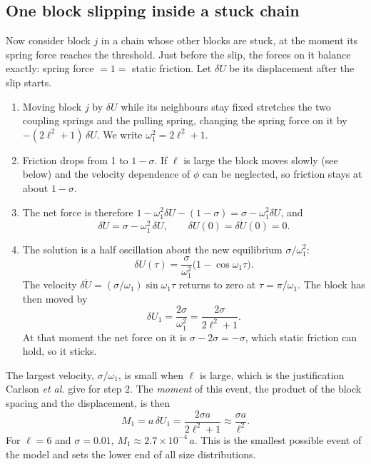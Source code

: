 \subsection{One block slipping inside a stuck chain}
\label{sec:one-block-event}

Now consider block $j$ in a chain whose other blocks are stuck, at the moment its spring force reaches the threshold.
Just before the slip, the forces on it balance exactly: spring force $= 1 =$ static friction. Let $\delta U$ be its
displacement after the slip starts.
\begin{enumerate}
  \item Moving block $j$ by $\delta U$ while its neighbours stay fixed stretches the two coupling springs and the pulling
    spring, changing the spring force on it by $-(2\ell^2+1)\,\delta U$. We write $\omega_1^2 = 2\ell^2+1$.
  \item Friction drops from 1 to $1-\sigma$. If $\ell$ is large the block moves slowly (see below) and the velocity
    dependence of $\phi$ can be neglected, so friction stays at about $1-\sigma$.
  \item The net force is therefore $1 - \omega_1^2\delta U - (1-\sigma) = \sigma - \omega_1^2\delta U$, and
    \begin{equation}
      \delta\ddot U = \sigma - \omega_1^2\,\delta U,\qquad \delta U(0)=\delta\dot U(0)=0 .
    \end{equation}
  \item The solution is a half oscillation about the new equilibrium $\sigma/\omega_1^2$:
    \begin{equation}
      \delta U(\tau) = \frac{\sigma}{\omega_1^2}\bigl(1-\cos\omega_1\tau\bigr).
      \label{eq:one-block}
    \end{equation}
    The velocity $\delta\dot U = (\sigma/\omega_1)\sin\omega_1\tau$ returns to zero at $\tau = \pi/\omega_1$. The block has then
    moved by
    \begin{equation}
      \delta U_1 = \frac{2\sigma}{\omega_1^2} = \frac{2\sigma}{2\ell^2+1}.
      \label{eq:dU1}
    \end{equation}
    At that moment the net force on it is $\sigma - 2\sigma = -\sigma$, which static friction can hold, so it sticks.
\end{enumerate}
The largest velocity, $\sigma/\omega_1$, is small when $\ell$ is large, which is the justification Carlson \emph{et al.} give for step 2.
The \emph{moment} of this event, the product of the block spacing and the displacement, is then
\begin{equation}
  M_1 = a\,\delta U_1 = \frac{2\sigma a}{2\ell^2+1} \approx \frac{\sigma a}{\ell^2}.
  \label{eq:M1}
\end{equation}
For $\ell = 6$ and $\sigma = 0.01$, $M_1\approx 2.7\times10^{-4}\,a$. This is the smallest possible event of the model and
sets the lower end of all size distributions.

